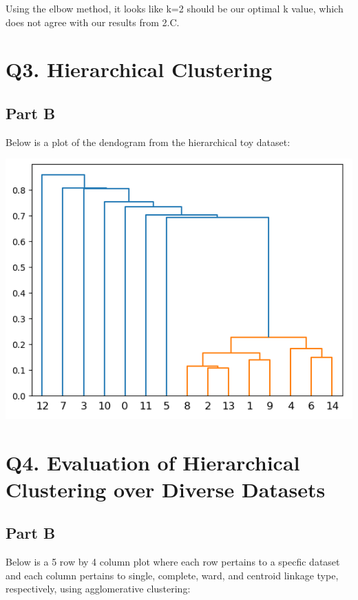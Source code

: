 \documentclass{article}
\begin{document}
Using the elbow method, it looks like k=2 should be our optimal k value, which does not agree with our 
results from 2.C.

\section*{Q3. Hierarchical Clustering}

\subsection*{Part B}
Below is a plot of the dendogram from the hierarchical toy dataset:

\includegraphics{Images/Screenshot 2024-03-17 165911.png}

\section*{Q4. Evaluation of Hierarchical Clustering over Diverse Datasets}

\subsection*{Part B}
Below is a 5 row by 4 column plot where each row pertains to a specfic dataset and each column pertains to single, 
complete, ward, and centroid linkage type, respectively, using agglomerative clustering:
\end{document}
